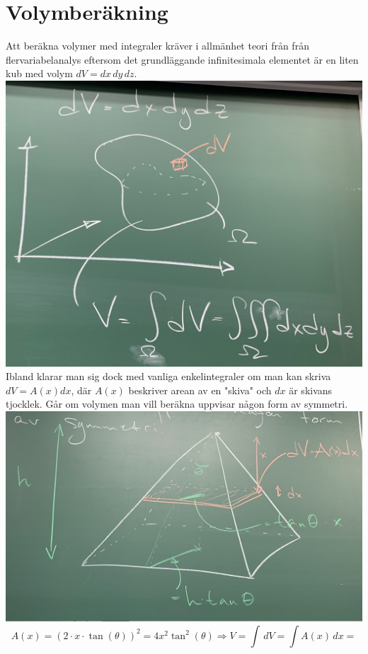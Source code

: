 \section{Volymberäkning}
Att beräkna volymer med integraler kräver i allmänhet teori från från flervariabelanalys eftersom det grundläggande infinitesimala elementet är en liten kub med volym $dV=dx\,dy\,dz$.
\includegraphics[scale=0.1]{lessons/lesson19/imgs/img03.jpg}
Ibland klarar man sig dock med vanliga enkelintegraler om man kan skriva $dV=A(x)dx$, där $A(x)$ beskriver arean av en "skiva" och $dx$ är skivans tjocklek.
Går om volymen man vill beräkna uppvisar någon form av symmetri.
\includegraphics[scale=0.1]{lessons/lesson19/imgs/img04.jpg}
\begin{equation*}
    A(x)=(2\cdot x\cdot\tan(\theta))^2=4x^2\tan^2(\theta)\Rightarrow
    V=\int\, dV=
    \int A(x)\, dx=
\end{equation*}
